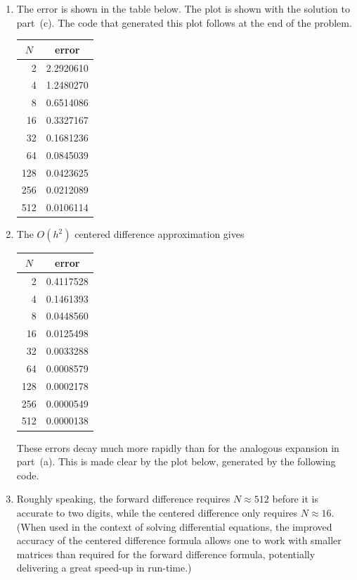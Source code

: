 \begin{solution}

\begin{enumerate}
\item The error is shown in the table below.  The plot is shown with the
      solution to part~(c).  The code that generated this plot follows 
      at the end of the problem.
\begin{center}
\begin{tabular}{rr}
\hline
\multicolumn{1}{c}{$N$} & \multicolumn{1}{c}{error} \\ 
\hline
   2  &  2.2920610 \\
   4  &  1.2480270 \\
   8  &  0.6514086 \\
  16  &  0.3327167 \\
  32  &  0.1681236 \\
  64  &  0.0845039 \\
 128  &  0.0423625 \\
 256  &  0.0212089 \\
 512  &  0.0106114
\end{tabular}\end{center} 

\item The $O(h^2)$ centered difference approximation gives
\begin{center}
\begin{tabular}{rr}
\hline
\multicolumn{1}{c}{$N$} & \multicolumn{1}{c}{error} \\
\hline
   2 &  0.4117528 \\
   4 &  0.1461393 \\
   8 &  0.0448560 \\
  16 &  0.0125498 \\
  32 &  0.0033288 \\
  64 &  0.0008579 \\
 128 &  0.0002178 \\
 256 &  0.0000549 \\
 512 &  0.0000138
\end{tabular}\end{center}
These errors decay much more rapidly than for the analogous expansion in part~(a).
This is made clear by the plot below, generated by the following code.

\item Roughly speaking, the forward difference requires $N\approx 512$ 
before it is accurate to two digits, while the centered difference only requires 
$N\approx 16$.   (When used in the context of solving differential equations,
the improved accuracy of the centered difference formula allows one to work
with smaller matrices than required for the forward difference formula,
potentially delivering a great speed-up in run-time.)


\end{enumerate}
\end{solution}
